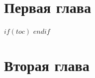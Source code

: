 \documentclass{article}
\begin{document}
\section{Первая глава}


$if(toc)$
\tableofcontents
$endif$

\section{Вторая глава}

\end{document}
